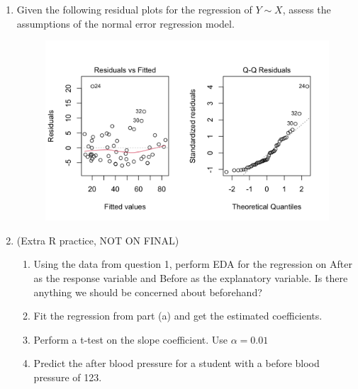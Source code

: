 \documentclass{article}
\begin{document}
\begin{enumerate}
    \item Given the following residual plots for the regression of $Y \sim X$, assess the assumptions of the normal error regression model.
    \begin{figure}[H]
        \includegraphics[scale=0.25]{images/non-normal-errors.png}
    \end{figure}\vspace{100pt}
    
    \item (Extra R practice, NOT ON FINAL) 
    \begin{enumerate}
        \item Using the data from question 1, perform EDA for the regression on After as the response variable and Before as the explanatory variable. Is there anything we should be concerned about beforehand?\vspace{150pt}
        \item Fit the regression from part (a) and get the estimated coefficients.\vspace{50pt}\newpage
        \item Perform a t-test on the slope coefficient. Use $\alpha = 0.01$\vspace{230pt}
        \item Predict the after blood pressure for a student with a before blood pressure of 123.\vspace{50pt}
    \end{enumerate}
        
\end{enumerate}
\end{document}
